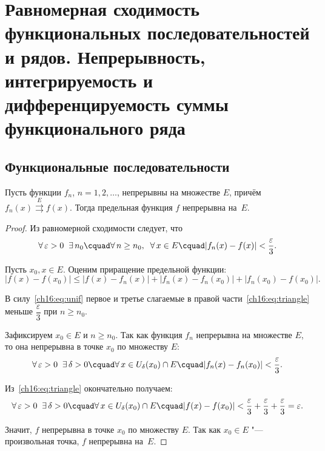 \chapter{Равномерная сходимость функциональных последовательностей и рядов.
Непрерывность, интегрируемость и дифференцируемость суммы функционального
ряда}

\section{Функциональные последовательности}

\begin{thm} \label{ch16:thm:cont}
Пусть функции $f_n$, $n = 1, 2, \ldots$, непрерывны на множестве $E$, причём $f_n(x) \overset{E}{\rightrightarrows} f(x)$. Тогда предельная функция $f$ непрерывна на~$E$.
\end{thm}

\begin{proof}
Из равномерной сходимости следует, что
\begin{equation} \label{ch16:eq:unif}
\forall\, \varepsilon > 0 \;\; \exists\, n_0 \cquad \forall\, n \ge n_0, \;\; \forall\, x \in E \cquad |f_n(x) - f(x)| < \frac{\varepsilon}{3}.
\end{equation}

Пусть $x_0, x \in E$. Оценим приращение предельной функции:
\begin{equation} \label{ch16:eq:triangle}
|f(x) - f(x_0)| \le |f(x) - f_n(x)| + |f_n(x) - f_n(x_0)| + |f_n(x_0) - f(x_0)|.
\end{equation}

В силу~\eqref{ch16:eq:unif} первое и третье слагаемые в правой части~\eqref{ch16:eq:triangle} меньше $\dfrac{\varepsilon}{3}$ при $n \ge n_0$.

Зафиксируем $x_0 \in E$ и $n \ge n_0$. Так как функция $f_n$ непрерывна на множестве $E$, то она непрерывна в точке $x_0$ по множеству $E$:
$$
\forall\, \varepsilon > 0 \;\; \exists\, \delta > 0 \cquad \forall\, x \in U_\delta(x_0) \cap E \cquad |f_n(x) - f_n(x_0)| < \frac{\varepsilon}{3}.
$$

Из~\eqref{ch16:eq:triangle} окончательно получаем:
$$
\forall\, \varepsilon > 0 \;\; \exists\, \delta > 0 \cquad \forall\, x \in U_\delta(x_0) \cap E \cquad |f(x) - f(x_0)| < \frac{\varepsilon}{3} + \frac{\varepsilon}{3} + \frac{\varepsilon}{3} = \varepsilon.
$$

Значит, $f$ непрерывна в точке $x_0$ по множеству $E$. Так как $x_0 \in E$ "--- произвольная точка, $f$ непрерывна на~$E$.
\end{proof}

